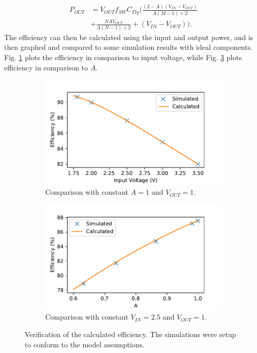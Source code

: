 \documentclass[conference]{IEEEtran}
\begin{document}
 	\begin{equation}
 	\begin{split}
 	P_{OUT} &= V_{OUT}f_{SW}C_{Fly}\Big(\tfrac{(2-A)(V_{IN} - V_{OUT})}{A(M-1) + 2} \\ 
 	&+ \tfrac{NAV_{OUT}}{A(N-1) + 2} + (V_{IN} - V_{OUT})\Big).
 	\end{split} 	
 	\label{eq:P_OUT}
 	\end{equation}
 	The efficiency can then be calculated using the input and output power, and is then graphed and compared to some simulation results with ideal components. Fig. \ref{fig:Comp_VIn} plots the efficiency in comparison to input voltage, while Fig. \ref{fig:Comp_A} plots efficiency in comparison to $A$.
 	
 	\begin{figure}
 		\begin{subfigure}{0.5\textwidth}
 			\includegraphics[width=\linewidth]{Figures/eta_VIn.pdf}
 			\caption{Comparison with constant $A = 1$ and $V_{OUT} = 1$.}
 			\label{fig:Comp_VIn}
 		\end{subfigure}
 	\begin{subfigure}{0.49\textwidth}
 		\includegraphics[width=\linewidth]{Figures/eta_A.pdf}
 		\caption{Comparison with constant $V_{IN} = 2.5$ and $V_{OUT} = 1$.}
 		\label{fig:Comp_A}
 	\end{subfigure}
 		\caption{Verification of the calculated efficiency. The simulations were setup to conform to the model assumptions.}
 	\end{figure}
 
\end{document}
